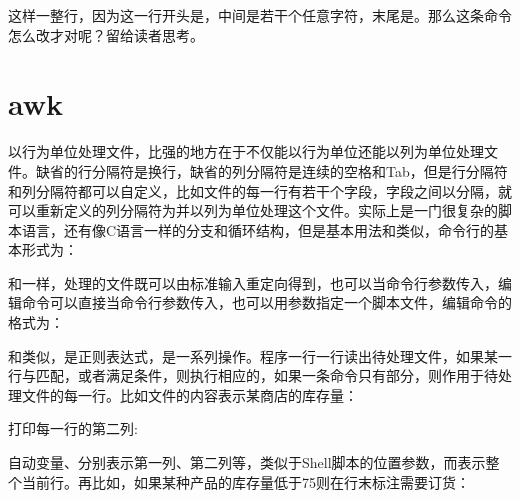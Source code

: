 

这样一整行，因为这一行开头是\BookCode{\textless{}}，中间是若干个任意字符，末尾是\BookCode{\textgreater{}}。那么这条命令怎么改才对呢？留给读者思考。




\section{awk}
%
以行为单位处理文件，比强的地方在于不仅能以行为单位还能以列为单位处理文件。缺省的行分隔符是换行，缺省的列分隔符是连续的空格和Tab，但是行分隔符和列分隔符都可以自定义，比如文件的每一行有若干个字段，字段之间以\BookCode{:\BookSplit{}}分隔，就可以重新定义的列分隔符为\BookCode{:\BookSplit{}}并以列为单位处理这个文件。实际上是一门很复杂的脚本语言，还有像C语言一样的分支和循环结构，但是基本用法和类似，命令行的基本形式为：




和一样，处理的文件既可以由标准输入重定向得到，也可以当命令行参数传入，编辑命令可以直接当命令行参数传入，也可以用参数指定一个脚本文件，编辑命令的格式为：




和类似，是正则表达式，是一系列操作。程序一行一行读出待处理文件，如果某一行与匹配，或者满足条件，则执行相应的，如果一条命令只有部分，则作用于待处理文件的每一行。比如文件的内容表示某商店的库存量：




打印每一行的第二列:




自动变量、分别表示第一列、第二列等，类似于Shell脚本的位置参数，而表示整个当前行。再比如，如果某种产品的库存量低于75则在行末标注需要订货：



